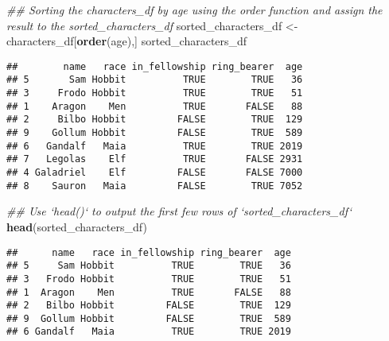 \documentclass[
]{article}
\newenvironment{Shaded}{\begin{snugshade}}{\end{snugshade}}
\newcommand{\CommentTok}[1]{\textcolor[rgb]{0.56,0.35,0.01}{\textit{#1}}}
\newcommand{\KeywordTok}[1]{\textcolor[rgb]{0.13,0.29,0.53}{\textbf{#1}}}
\newcommand{\NormalTok}[1]{#1}
\newcommand{\OperatorTok}[1]{\textcolor[rgb]{0.81,0.36,0.00}{\textbf{#1}}}
\newcommand{\OtherTok}[1]{\textcolor[rgb]{0.56,0.35,0.01}{#1}}
\newcommand{\StringTok}[1]{\textcolor[rgb]{0.31,0.60,0.02}{#1}}
\begin{document}
\begin{Shaded}
\begin{Highlighting}[]
\CommentTok{## Sorting the characters_df by age using the order function and assign the result to the sorted_characters_df}
\NormalTok{sorted_characters_df <-}\StringTok{ }\NormalTok{characters_df[}\KeywordTok{order}\NormalTok{(age),]}
\NormalTok{sorted_characters_df}
\end{Highlighting}
\end{Shaded}

\begin{verbatim}
##        name   race in_fellowship ring_bearer  age
## 5       Sam Hobbit          TRUE        TRUE   36
## 3     Frodo Hobbit          TRUE        TRUE   51
## 1    Aragon    Men          TRUE       FALSE   88
## 2     Bilbo Hobbit         FALSE        TRUE  129
## 9    Gollum Hobbit         FALSE        TRUE  589
## 6   Gandalf   Maia          TRUE        TRUE 2019
## 7   Legolas    Elf          TRUE       FALSE 2931
## 4 Galadriel    Elf         FALSE       FALSE 7000
## 8    Sauron   Maia         FALSE        TRUE 7052
\end{verbatim}

\begin{Shaded}
\begin{Highlighting}[]
\CommentTok{## Use `head()` to output the first few rows of `sorted_characters_df`}
\KeywordTok{head}\NormalTok{(sorted_characters_df)}
\end{Highlighting}
\end{Shaded}

\begin{verbatim}
##      name   race in_fellowship ring_bearer  age
## 5     Sam Hobbit          TRUE        TRUE   36
## 3   Frodo Hobbit          TRUE        TRUE   51
## 1  Aragon    Men          TRUE       FALSE   88
## 2   Bilbo Hobbit         FALSE        TRUE  129
## 9  Gollum Hobbit         FALSE        TRUE  589
## 6 Gandalf   Maia          TRUE        TRUE 2019
\end{verbatim}

\begin{Shaded}
\end{Shaded}
\end{document}
